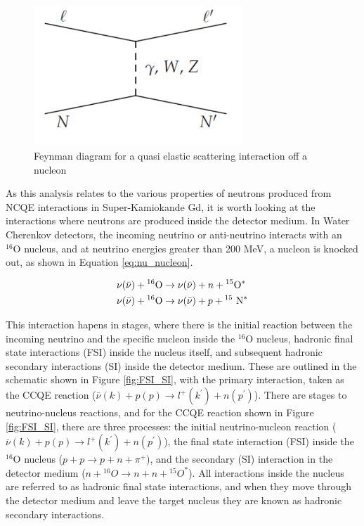 \begin{figure}
    \centering
    \includegraphics[width=0.7\textwidth]{Figures/QE_feynman.png}
    \caption{Feynman diagram for a quasi elastic scattering interaction off a nucleon}
    \label{fig:QE_reaction}
\end{figure}



As this analysis relates to the various properties of neutrons produced from NCQE interactions in Super-Kamiokande Gd, it is worth looking at the interactions where neutrons are produced inside the detector medium. In Water Cherenkov detectors, the incoming neutrino or anti-neutrino interacts with an ${ }^{16} \mathrm{O}$ nucleus, and at neutrino energies greater than 200 MeV, a nucleon is knocked out, as shown in Equation \ref{eq:nu_nucleon}.

\begin{align}
&\nu(\bar{\nu})+{ }^{16} \mathrm{O} \rightarrow \nu(\bar{\nu})+n+{ }^{15} \mathrm{O}^{*} \label{eq:nu_nucleon} \\
&\nu(\bar{\nu})+{ }^{16} \mathrm{O} \rightarrow \nu(\bar{\nu})+p+{ }^{15} \mathrm{~N}^{*} \notag
\end{align}


This interaction hapens in stages, where there is the initial reaction between the incoming neutrino and the specific nucleon inside the ${ }^{16} \mathrm{O}$ nucleus, hadronic final state interactions (FSI) inside the nucleus itself, and subsequent hadronic secondary interactions (SI) inside the detector medium. These are outlined in the schematic shown in Figure \ref{fig:FSI_SI}, with the primary interaction, taken as the CCQE reaction ($\bar{\nu}(k)+p(p) \rightarrow l^{+}\left(k^{\prime}\right)+n\left(p^{\prime}\right)$).
There are stages to neutrino-nucleus reactions, and for the CCQE reaction shown in Figure \ref{fig:FSI_SI}, there are three processes: the initial neutrino-nucleon reaction ($\bar{\nu}(k)+p(p) \rightarrow l^{+}\left(k^{\prime}\right)+n\left(p^{\prime}\right)$), the final state interaction (FSI) \cite{Golan_2012} inside the ${ }^{16} \mathrm{O}$ nucleus ($p+p \rightarrow p+n+\pi^{+}$), and the secondary (SI) interaction \cite{haigh2015results} in the detector medium ($n+{ }^{16} O \rightarrow n+n+{ }^{15} O^{*}$). All interactions inside the nucleus are referred to as hadronic final state interactions, and when they move through the detector medium and leave the target nucleus they are known as hadronic secondary interactions. 



